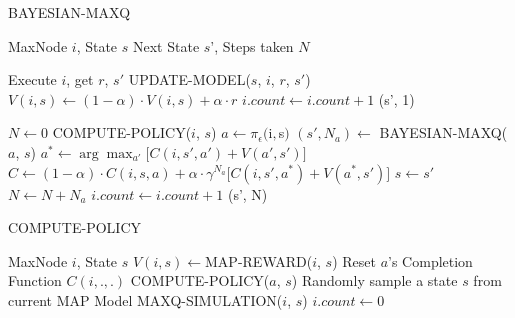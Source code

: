 
\begin{algorithm}[t]
\caption{BAYESIAN-MAXQ} \label{fig:MayesianMaxQ}
\begin{algorithmic}[1]
\REQUIRE MaxNode $i$, State $s$
\ENSURE Next State $s$', Steps taken $N$

\STATE Execute $i$, get $r$, $s'$
\STATE UPDATE-MODEL($s$, $i$, $r$, $s'$)
\STATE $V(i,s) \leftarrow (1-\alpha)\cdot V(i,s)+\alpha\cdot r$
\STATE $i.count \leftarrow i.count+1$
\RETURN (s', 1)

\ELSE
\STATE $N \leftarrow 0$
\STATE COMPUTE-POLICY($i$, $s$)
\STATE $a\leftarrow \pi_{\epsilon}($i$, $s$)$
\STATE $(s', N_a)\leftarrow$ BAYESIAN-MAXQ($a$, $s$)
\STATE $a^*\leftarrow \arg\max_{a'}\bigl[C(i,s',a')+V(a',s')\bigr]$
\STATE $C\leftarrow(1-\alpha)\cdot C(i,s,a) + \alpha\cdot \gamma^{N_a}\bigl[C(i,s',a^*)+V(a^*,s') \bigr]$
\STATE $s\leftarrow s'$
\STATE $N\leftarrow N+N_a$
\STATE $i.count \leftarrow i.count+1$
\ENDWHILE
\RETURN (s', N)
\ENDIF
\end{algorithmic}
\end{algorithm} 


\begin{algorithm}[t]
\caption{COMPUTE-POLICY} \label{fig:ComputePolicy}
\begin{algorithmic}[1]
\REQUIRE MaxNode $i$, State $s$
\STATE $V(i, s)\leftarrow $MAP-REWARD($i$, $s$) 
\ENDFOR
\ELSE
{}
\STATE Reset $a$'s Completion Function $C(i, ., .)$
\STATE COMPUTE-POLICY($a$, $s$)
\ENDFOR
{} 
\STATE Randomly sample a state $s$ from current MAP Model
\STATE MAXQ-SIMULATION($i$, $s$)
\ENDFOR
\ENDIF
\STATE $i.count \leftarrow 0$
\ENDIF
\end{algorithmic}
\end{algorithm} 


